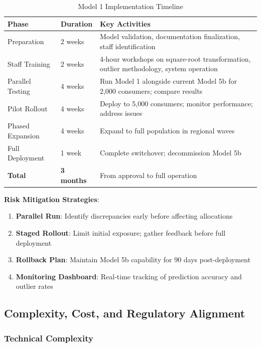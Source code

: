 \begin{table}[h]
\centering
\caption{Model 1 Implementation Timeline}
\begin{tabular}{llp{8cm}}
\toprule
\textbf{Phase} & \textbf{Duration} & \textbf{Key Activities} \\
\midrule
Preparation & 2 weeks & Model validation, documentation finalization, staff identification \\
Staff Training & 2 weeks & 4-hour workshops on square-root transformation, outlier methodology, system operation \\
Parallel Testing & 4 weeks & Run Model 1 alongside current Model 5b for 2,000 consumers; compare results \\
Pilot Rollout & 4 weeks & Deploy to 5,000 consumers; monitor performance; address issues \\
Phased Expansion & 4 weeks & Expand to full population in regional waves \\
Full Deployment & 1 week & Complete switchover; decommission Model 5b \\
\midrule
\textbf{Total} & \textbf{3 months} & From approval to full operation \\
\bottomrule
\end{tabular}
\end{table}

\textbf{Risk Mitigation Strategies}:
\begin{enumerate}
    \item \textbf{Parallel Run}: Identify discrepancies early before affecting allocations
    \item \textbf{Staged Rollout}: Limit initial exposure; gather feedback before full deployment
    \item \textbf{Rollback Plan}: Maintain Model 5b capability for 90 days post-deployment
    \item \textbf{Monitoring Dashboard}: Real-time tracking of prediction accuracy and outlier rates
\end{enumerate}

\subsection{Complexity, Cost, and Regulatory Alignment}

\subsubsection{Technical Complexity}

